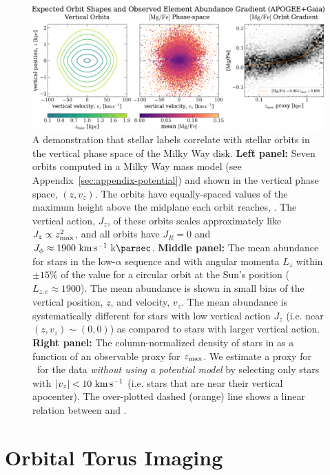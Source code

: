 \begin{figure}[t!]
\begin{center}
\includegraphics[width=1\textwidth]{mgfe-zvz.pdf}
\end{center}
\caption{%
A demonstration that stellar labels correlate with stellar orbits in the vertical phase
space of the Milky Way disk.
\textbf{Left panel:} Seven orbits computed in a Milky Way mass model (see
Appendix~\ref{sec:appendix-potential}) and shown in the vertical phase space, $(z,
v_z)$.
The orbits have equally-spaced values of the maximum height above the midplane each
orbit reaches, \zmax.
The vertical action, $J_z$, of these orbits scales approximately like $J_z \propto
z_{\textrm{max}}^2$, and all orbits have $J_R=0$ and $J_\phi\approx 1900~\kms~\kpc$.
\textbf{Middle panel:} The mean  abundance for stars in the low-$\alpha$
sequence and with angular momenta $L_z$ within $\pm 15\%$ of the value for a circular
orbit at the Sun's position ($L_{z, c} \approx 1900$).
The mean  abundance is shown in small bins of the vertical position, $z$,
and velocity, $v_z$.
The mean abundance is systematically different for stars with low vertical action $J_z$
(i.e. near $(z, v_z) \sim (0, 0)$) as compared to stars with larger vertical action.
\textbf{Right panel:} The column-normalized density of stars in  as a
function of an observable proxy for $z_{\textrm{max}}$.
We estimate a proxy for \zmax\ for the data \emph{without using a potential model} by
selecting only stars with $|v_z| < 10~\kms$ (i.e. stars that are near their vertical
apocenter).
The over-plotted dashed (orange) line shows a linear relation between  and
\zmax.
\label{fig:mgfe-zvz}
}
\end{figure}


\section{Orbital Torus Imaging} \label{sec:oti}

